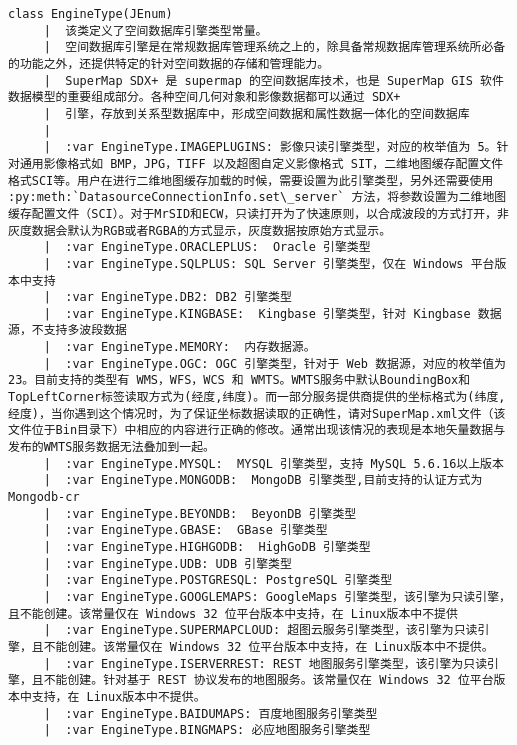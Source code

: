 \documentclass[11pt]{article}
\begin{document}
\begin{Verbatim}[commandchars=\\\{\}]
    class EngineType(JEnum)
     |  该类定义了空间数据库引擎类型常量。
     |  空间数据库引擎是在常规数据库管理系统之上的，除具备常规数据库管理系统所必备的功能之外，还提供特定的针对空间数据的存储和管理能力。
     |  SuperMap SDX+ 是 supermap 的空间数据库技术，也是 SuperMap GIS 软件数据模型的重要组成部分。各种空间几何对象和影像数据都可以通过 SDX+
     |  引擎，存放到关系型数据库中，形成空间数据和属性数据一体化的空间数据库
     |  
     |  :var EngineType.IMAGEPLUGINS: 影像只读引擎类型，对应的枚举值为 5。针对通用影像格式如 BMP，JPG，TIFF 以及超图自定义影像格式 SIT，二维地图缓存配置文件格式SCI等。用户在进行二维地图缓存加载的时候，需要设置为此引擎类型，另外还需要使用 :py:meth:`DatasourceConnectionInfo.set\_server` 方法，将参数设置为二维地图缓存配置文件（SCI）。对于MrSID和ECW，只读打开为了快速原则，以合成波段的方式打开，非灰度数据会默认为RGB或者RGBA的方式显示，灰度数据按原始方式显示。
     |  :var EngineType.ORACLEPLUS:  Oracle 引擎类型
     |  :var EngineType.SQLPLUS: SQL Server 引擎类型，仅在 Windows 平台版本中支持
     |  :var EngineType.DB2: DB2 引擎类型
     |  :var EngineType.KINGBASE:  Kingbase 引擎类型，针对 Kingbase 数据源，不支持多波段数据
     |  :var EngineType.MEMORY:  内存数据源。
     |  :var EngineType.OGC: OGC 引擎类型，针对于 Web 数据源，对应的枚举值为 23。目前支持的类型有 WMS，WFS，WCS 和 WMTS。WMTS服务中默认BoundingBox和TopLeftCorner标签读取方式为(经度,纬度)。而一部分服务提供商提供的坐标格式为(纬度,经度)，当你遇到这个情况时，为了保证坐标数据读取的正确性，请对SuperMap.xml文件（该文件位于Bin目录下）中相应的内容进行正确的修改。通常出现该情况的表现是本地矢量数据与发布的WMTS服务数据无法叠加到一起。
     |  :var EngineType.MYSQL:  MYSQL 引擎类型，支持 MySQL 5.6.16以上版本
     |  :var EngineType.MONGODB:  MongoDB 引擎类型,目前支持的认证方式为Mongodb-cr
     |  :var EngineType.BEYONDB:  BeyonDB 引擎类型
     |  :var EngineType.GBASE:  GBase 引擎类型
     |  :var EngineType.HIGHGODB:  HighGoDB 引擎类型
     |  :var EngineType.UDB: UDB 引擎类型
     |  :var EngineType.POSTGRESQL: PostgreSQL 引擎类型
     |  :var EngineType.GOOGLEMAPS: GoogleMaps 引擎类型，该引擎为只读引擎，且不能创建。该常量仅在 Windows 32 位平台版本中支持，在 Linux版本中不提供
     |  :var EngineType.SUPERMAPCLOUD: 超图云服务引擎类型，该引擎为只读引擎，且不能创建。该常量仅在 Windows 32 位平台版本中支持，在 Linux版本中不提供。
     |  :var EngineType.ISERVERREST: REST 地图服务引擎类型，该引擎为只读引擎，且不能创建。针对基于 REST 协议发布的地图服务。该常量仅在 Windows 32 位平台版本中支持，在 Linux版本中不提供。
     |  :var EngineType.BAIDUMAPS: 百度地图服务引擎类型
     |  :var EngineType.BINGMAPS: 必应地图服务引擎类型

\end{Verbatim}
\end{document}
